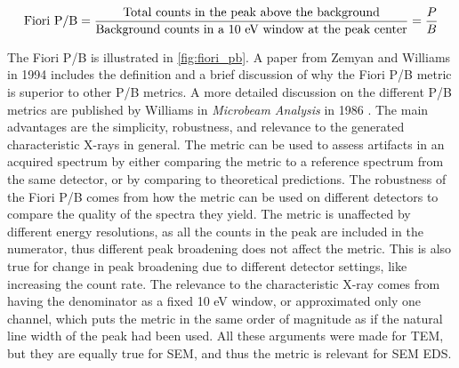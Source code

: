 \begin{equation}
    \label{eq:fiori_pb}
    \textnormal{Fiori P/B} = \frac{\textnormal{Total counts in the peak above the background}}{\textnormal{Background counts in a 10 eV window at the peak center}} = \frac{P}{B}
\end{equation}




The Fiori P/B is illustrated in \cref{fig:fiori_pb}.
A paper from Zemyan and Williams in 1994 \cite{zemyan_standard_performance_1994} includes the definition and a brief discussion of why the Fiori P/B metric is superior to other P/B metrics.
A more detailed discussion on the different P/B metrics are published by Williams in \emph{Microbeam Analysis} in 1986 \cite{williams_standard_definitions_1986}.
The main advantages are the simplicity, robustness, and relevance to the generated characteristic X-rays in general.
The metric can be used to assess artifacts in an acquired spectrum by either comparing the metric to a reference spectrum from the same detector, or by comparing to theoretical predictions.
The robustness of the Fiori P/B comes from how the metric can be used on different detectors to compare the quality of the spectra they yield.
The metric is unaffected by different energy resolutions, as all the counts in the peak are included in the numerator, thus different peak broadening does not affect the metric.
This is also true for change in peak broadening due to different detector settings, like increasing the count rate.
The relevance to the characteristic X-ray comes from having the denominator as a fixed 10 eV window, or approximated only one channel, which puts the metric in the same order of magnitude as if the natural line width of the peak had been used.
All these arguments were made for TEM, but they are equally true for SEM, and thus the metric is relevant for SEM EDS.





